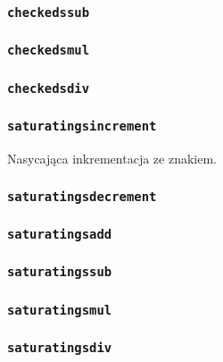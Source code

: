 \subsubsection{\texttt{checkedssub}}
\subsubsection{\texttt{checkedsmul}}
\subsubsection{\texttt{checkedsdiv}}

\subsubsection{\texttt{saturatingsincrement}}

Nasycająca inkrementacja ze znakiem.

\subsubsection{\texttt{saturatingsdecrement}}
\subsubsection{\texttt{saturatingsadd}}
\subsubsection{\texttt{saturatingssub}}
\subsubsection{\texttt{saturatingsmul}}
\subsubsection{\texttt{saturatingsdiv}}
